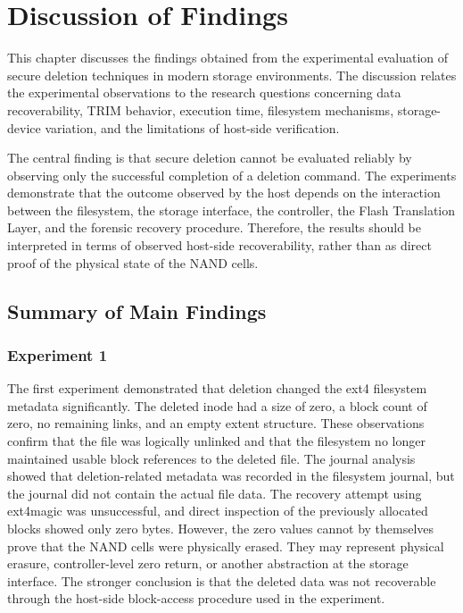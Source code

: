 \chapter{Discussion of Findings}
\label{sec:interpretation-findings}

This chapter discusses the findings obtained from the experimental evaluation of secure deletion techniques in modern storage environments. The discussion relates the 
experimental observations to the research questions concerning data recoverability, TRIM behavior, execution time, filesystem mechanisms, storage-device variation, 
and the limitations of host-side verification.

The central finding is that secure deletion cannot be evaluated reliably by observing only the successful completion of a deletion command. The experiments demonstrate 
that the outcome observed by the host depends on the interaction between the filesystem, the storage interface, the controller, the Flash Translation Layer, and the 
forensic recovery procedure. Therefore, the results should be interpreted in terms of observed host-side recoverability, rather than as direct proof of the physical 
state of the NAND cells.

\section{Summary of Main Findings}

\subsection*{Experiment 1}
The first experiment demonstrated that deletion changed the ext4 filesystem metadata significantly. The deleted inode had a size of zero, a block count of zero, no 
remaining links, and an empty extent structure. These observations confirm that the file was logically unlinked and that the filesystem no longer maintained usable 
block references to the deleted file.
The journal analysis showed that deletion-related metadata was recorded in the filesystem journal, but the journal did not contain the actual file data. The recovery 
attempt using ext4magic was unsuccessful, and direct inspection of the previously allocated blocks showed only zero bytes. However, the zero values cannot by themselves 
prove that the NAND cells were physically erased. They may represent physical erasure, controller-level zero return, or another abstraction at the storage interface. 
The stronger conclusion is that the deleted data was not recoverable through the host-side block-access procedure used in the experiment.

